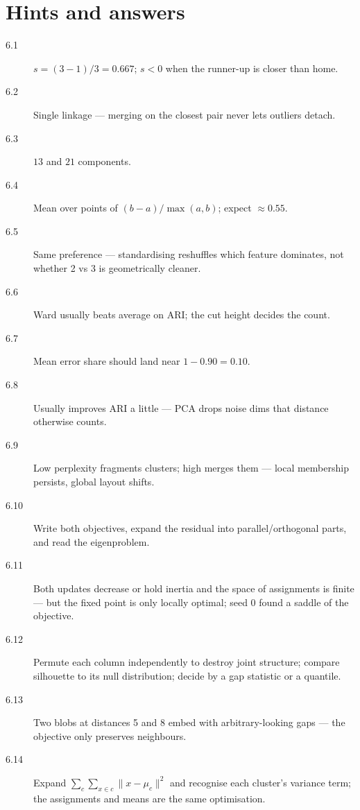 \section*{Hints and answers}
\begin{description}
\item[6.1] $s = (3-1)/3 = 0.667$; $s<0$ when the runner-up is closer
  than home.
\item[6.2] Single linkage --- merging on the closest pair never lets
  outliers detach.
\item[6.3] $13$ and $21$ components.
\item[6.4] Mean over points of $(b-a)/\max(a,b)$; expect $\approx 0.55$.
\item[6.5] Same preference --- standardising reshuffles which feature
  dominates, not whether 2 vs 3 is geometrically cleaner.
\item[6.6] Ward usually beats average on ARI; the cut height decides
  the count.
\item[6.7] Mean error share should land near $1 - 0.90 = 0.10$.
\item[6.8] Usually improves ARI a little --- PCA drops noise dims that
  distance otherwise counts.
\item[6.9] Low perplexity fragments clusters; high merges them ---
  local membership persists, global layout shifts.
\item[6.10] Write both objectives, expand the residual into
  parallel/orthogonal parts, and read the eigenproblem.
\item[6.11] Both updates decrease or hold inertia and the space of
  assignments is finite --- but the fixed point is only locally
  optimal; seed 0 found a saddle of the objective.
\item[6.12] Permute each column independently to destroy joint
  structure; compare silhouette to its null distribution; decide by a
  gap statistic or a quantile.
\item[6.13] Two blobs at distances 5 and 8 embed with arbitrary-looking
  gaps --- the objective only preserves neighbours.
\item[6.14] Expand $\sum_{c}\sum_{x\in c}\|x-\mu_c\|^2$ and recognise
  each cluster's variance term; the assignments and means are the same
  optimisation.
\end{description}
